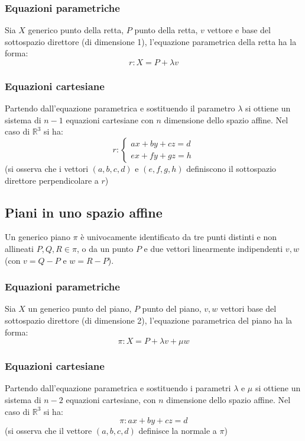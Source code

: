 \documentclass[a4paper]{article}
\begin{document}
\subsubsection*{Equazioni parametriche}
Sia \(X\) generico punto della retta, \(P\) punto della retta, \(v\) vettore e base del sottospazio direttore (di dimensione 1),
l'equazione parametrica della retta ha la forma:
\[r : X = P + \lambda v\]

\subsubsection*{Equazioni cartesiane}
Partendo dall'equazione parametrica e sostituendo il parametro \(\lambda\) si ottiene un sistema di \(n-1\) equazioni cartesiane
con \(n\) dimensione dello spazio affine. Nel caso di \(\mathbb{R}^3\) si ha:
\[r: \begin{cases}
	ax + by + cz = d \\
	ex + fy + gz = h
\end{cases}\]
(si osserva che i vettori \((a, b, c, d)\) e \((e, f, g, h)\) definiscono il sottospazio direttore perpendicolare a \(r\))

\subsection{Piani in uno spazio affine}
Un generico piano \(\pi\) è univocamente identificato da tre punti distinti e non allineati \(P, Q, R \in \pi\), o da un punto
\(P\) e due vettori linearmente indipendenti \(v, w\) (con \(v = Q-P\) e \(w = R-P\)).

\subsubsection*{Equazioni parametriche}
Sia \(X\) un generico punto del piano, \(P\) punto del piano, \(v, w\) vettori base del sottospazio direttore (di dimensione 2),
l'equazione parametrica del piano ha la forma:
\[\pi: X = P + \lambda v + \mu w\]

\subsubsection*{Equazioni cartesiane}
Partendo dall'equazione parametrica e sostituendo i parametri \(\lambda\) e \(\mu\) si ottiene un sistema di \(n-2\) equazioni
cartesiane, con \(n\) dimensione dello spazio affine. Nel caso di \(\mathbb{R}^3\) si ha:
\[\pi: ax + by + cz = d\]
(si osserva che il vettore \((a, b, c, d)\) definisce la normale a \(\pi\))
\end{document}
